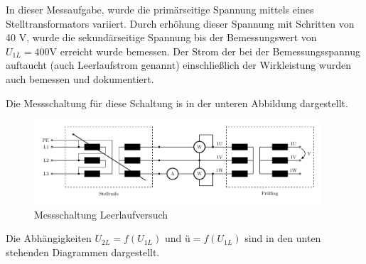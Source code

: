 In dieser Messaufgabe, wurde die primärseitige Spannung mittels eines Stelltransformators variiert. Durch erhöhung dieser Spannung mit Schritten von 40 V, wurde die sekundärseitige Spannung bis der Bemessungswert von $U_{1L} = 400 \text{V}$ erreicht wurde bemessen. Der Strom der bei der Bemessungsspannug auftaucht (auch Leerlaufstrom genannt) einschließlich der Wirkleistung wurden auch bemessen und dokumentiert. \par  
Die Messschaltung für diese Schaltung is in der unteren Abbildung dargestellt. \par 
\begin{figure}[H]
    \centering
    \includegraphics[width=0.95\textwidth]{fig/ll_mess.pdf}
    \caption{Messschaltung Leerlaufversuch }
\end{figure}
 Die Abhängigkeiten $U_{2L} = f(U_{1L}) $ und $ \text{ü} = f(U_{1L})$ sind in den unten stehenden Diagrammen dargestellt.  \par 
